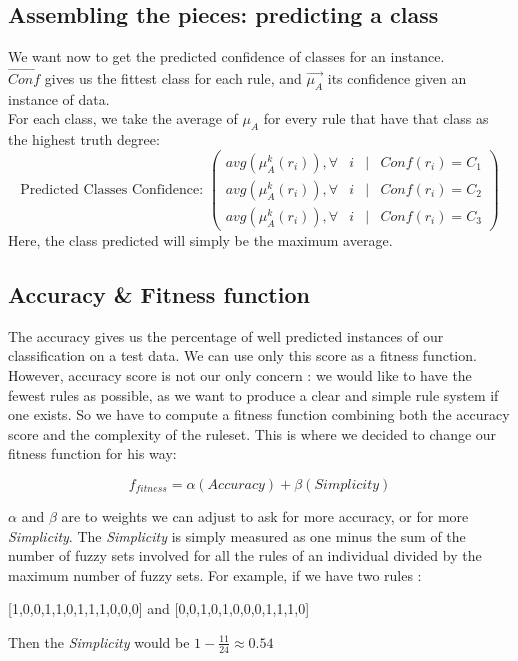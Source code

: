 \documentclass[a4paper,12pt]{article}
\begin{document}
\subsection{Assembling the pieces: predicting a class}

We want now to get the predicted confidence of classes for an instance.\\
$\vec{Conf}$ gives us the fittest class for each rule, and $\vec{\mu_A}$ its confidence given an instance of data. \\
For each class, we take the average of $\mu_A$ for every rule that have that class as the highest truth degree:
\[
\text{Predicted Classes Confidence: }
\begin{pmatrix}
avg(\mu_A^k(r_i)), \forall & i & | & Conf(r_i)=C_1\\
avg(\mu_A^k(r_i)), \forall & i & | & Conf(r_i)=C_2\\
avg(\mu_A^k(r_i)), \forall & i & | & Conf(r_i)=C_3
\end{pmatrix}
\]
Here, the class predicted will simply be the maximum average.


\subsection{Accuracy \& Fitness function}

The accuracy gives us the percentage of well predicted instances of our classification on a test data. We can use only this score as a fitness function.\\
However, accuracy score is not our only concern : we would like to have the fewest rules as possible, as we want to produce a clear and simple rule system if one exists. So we have to compute a fitness function combining both the accuracy score and the complexity of the ruleset.
This is where we decided to change our fitness function for his way:

\[f_{fitness}=\alpha (Accuracy)+\beta(Simplicity)\]

$\alpha$ and $\beta$ are to weights we can adjust to ask for more accuracy, or for more \textit{Simplicity}.
The \textit{Simplicity} is simply measured as one minus the sum of the number of fuzzy sets involved for all the rules of an individual divided by the maximum number of fuzzy sets. 
For example, if we have two rules :
\begin{center}[1,0,0,1,1,0,1,1,1,0,0,0] and [0,0,1,0,1,0,0,0,1,1,1,0]
\end{center}
Then the \textit{Simplicity} would be $1 - \frac{11}{24} \approx 0.54	$
\end{document}
